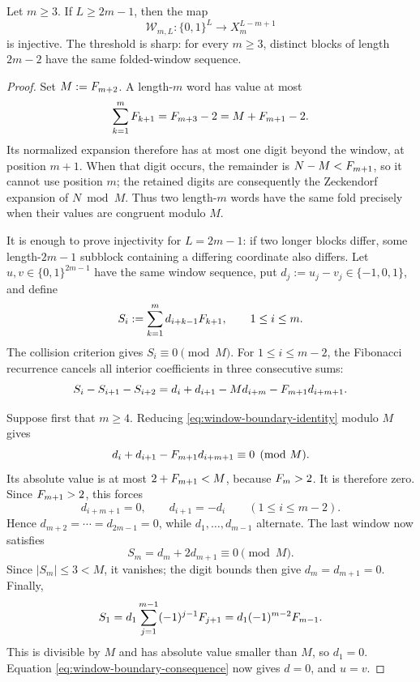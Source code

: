 \begin{theorem}\label{thm:block-separation}
Let $m\ge3$. If $L\ge2m-1$, then the map
\[
\mathcal{W}_{m,L}:\{0,1\}^L\longrightarrow X_m^{L-m+1}
\]
is injective. The threshold is sharp: for every $m\ge3$, distinct blocks of length $2m-2$ have the same folded-window sequence.
\end{theorem}

\begin{proof}
Set $M:=F_{m+2}$. A length-$m$ word has value at most
\[
\sum_{k=1}^mF_{k+1}=F_{m+3}-2
=M+F_{m+1}-2.
\]
Its normalized expansion therefore has at most one digit beyond the window, at position $m+1$. When that digit occurs, the remainder is $N-M<F_{m+1}$, so it cannot use position $m$; the retained digits are consequently the Zeckendorf expansion of $N\bmod M$. Thus two length-$m$ words have the same fold precisely when their values are congruent modulo $M$.

It is enough to prove injectivity for $L=2m-1$: if two longer blocks differ, some length-$2m-1$ subblock containing a differing coordinate also differs. Let $u,v\in\{0,1\}^{2m-1}$ have the same window sequence, put $d_j:=u_j-v_j\in\{-1,0,1\}$, and define
\[
S_i:=\sum_{k=1}^m d_{i+k-1}F_{k+1},
\qquad 1\le i\le m.
\]
The collision criterion gives $S_i\equiv0\pmod M$. For $1\le i\le m-2$, the Fibonacci recurrence cancels all interior coefficients in three consecutive sums:
\begin{equation}\label{eq:window-boundary-identity}
S_i-S_{i+1}-S_{i+2}
=d_i+d_{i+1}-M d_{i+m}-F_{m+1}d_{i+m+1}.
\end{equation}

Suppose first that $m\ge4$. Reducing \eqref{eq:window-boundary-identity} modulo $M$ gives
\[
d_i+d_{i+1}-F_{m+1}d_{i+m+1}\equiv0\pmod M.
\]
Its absolute value is at most $2+F_{m+1}<M$, because $F_m>2$. It is therefore zero. Since $F_{m+1}>2$, this forces
\begin{equation}\label{eq:window-boundary-consequence}
d_{i+m+1}=0,
\qquad d_{i+1}=-d_i
\qquad(1\le i\le m-2).
\end{equation}
Hence $d_{m+2}=\cdots=d_{2m-1}=0$, while $d_1,\ldots,d_{m-1}$ alternate. The last window now satisfies
\[
S_m=d_m+2d_{m+1}\equiv0\pmod M.
\]
Since $|S_m|\le3<M$, it vanishes; the digit bounds then give $d_m=d_{m+1}=0$. Finally,
\[
S_1=d_1\sum_{j=1}^{m-1}(-1)^{j-1}F_{j+1}
=d_1(-1)^{m-2}F_{m-1}.
\]
This is divisible by $M$ and has absolute value smaller than $M$, so $d_1=0$. Equation \eqref{eq:window-boundary-consequence} now gives $d=0$, and $u=v$.


\end{proof}
